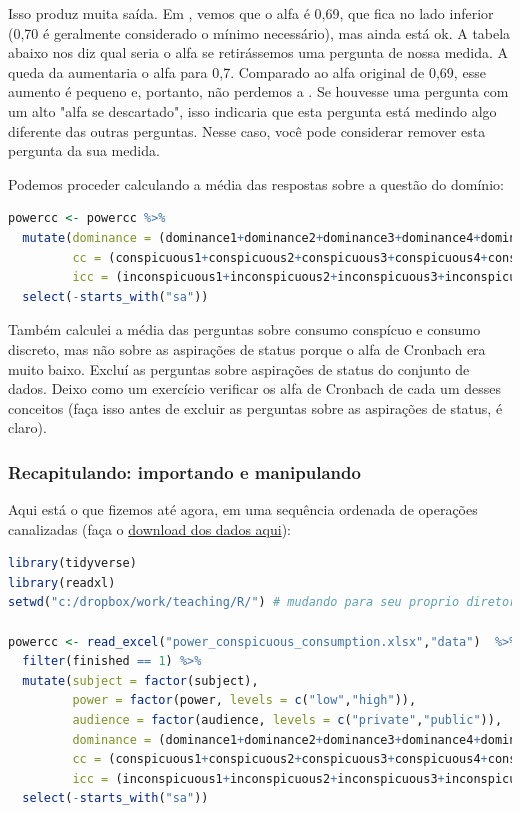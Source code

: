 \documentclass{article}
\begin{document}
Isso produz muita saída. Em , vemos que o alfa é 0,69, que fica no lado inferior (0,70 é geralmente considerado o mínimo necessário), mas ainda está ok. A tabela abaixo nos diz qual seria o alfa se retirássemos uma pergunta de nossa medida. A queda da  aumentaria o alfa para 0,7. Comparado ao alfa original de 0,69, esse aumento é pequeno e, portanto, não perdemos a . Se houvesse uma pergunta com um alto "alfa se descartado", isso indicaria que esta pergunta está medindo algo diferente das outras perguntas. Nesse caso, você pode considerar remover esta pergunta da sua medida.

Podemos proceder calculando a média das respostas sobre a questão do domínio:

\begin{lstlisting}[language=R]
powercc <- powercc %>% 
  mutate(dominance = (dominance1+dominance2+dominance3+dominance4+dominance5+dominance6+dominance7)/7,
         cc = (conspicuous1+conspicuous2+conspicuous3+conspicuous4+conspicuous5)/5,
         icc = (inconspicuous1+inconspicuous2+inconspicuous3+inconspicuous4+inconspicuous5)/5) %>% 
  select(-starts_with("sa"))
\end{lstlisting}

Também calculei a média das perguntas sobre consumo conspícuo e consumo discreto, mas não sobre as aspirações de status porque o alfa de Cronbach era muito baixo. Excluí as perguntas sobre aspirações de status do conjunto de dados. Deixo como um exercício verificar os alfa de Cronbach de cada um desses conceitos (faça isso antes de excluir as perguntas sobre as aspirações de status, é claro).

\subsubsection{Recapitulando: importando e manipulando}

Aqui está o que fizemos até agora, em uma sequência ordenada de operações canalizadas (faça o \href{http://users.telenet.be/samuelfranssens/tutorial_data/power_conspicuous_consumption.xlsx}{download dos dados aqui}):

\begin{lstlisting}[language=R]
library(tidyverse)
library(readxl)
setwd("c:/dropbox/work/teaching/R/") # mudando para seu proprio diretorio

powercc <- read_excel("power_conspicuous_consumption.xlsx","data")  %>%
  filter(finished == 1) %>% 
  mutate(subject = factor(subject),
         power = factor(power, levels = c("low","high")),
         audience = factor(audience, levels = c("private","public")),
         dominance = (dominance1+dominance2+dominance3+dominance4+dominance5+dominance6+dominance7)/7,
         cc = (conspicuous1+conspicuous2+conspicuous3+conspicuous4+conspicuous5)/5,
         icc = (inconspicuous1+inconspicuous2+inconspicuous3+inconspicuous4+inconspicuous5)/5) %>% 
  select(-starts_with("sa"))
\end{lstlisting}
\end{document}
